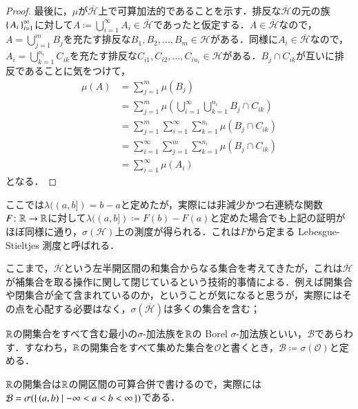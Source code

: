 \begin{proof}
最後に，$\mu$が$\overline{\mathcal{H}}$上で可算加法的であることを示す．排反な$\overline{\mathcal{H}}$の元の族$\set{A_i}_{i=1}^\infty$に対して$A \coloneqq \bigcup_{i=1}^\infty A_i \in \overline{\mathcal{H}}$であったと仮定する．$A \in \overline{\mathcal{H}}$なので，$A = \bigcup_{j=1}^m B_j$を充たす排反な$B_1, B_2, \dots, B_m \in \mathcal{H}$がある．同様に$A_i \in \overline{\mathcal{H}}$なので，$A_i = \bigcup_{k=1}^{n_i} C_{ik}$を充たす排反な$C_{i1},C_{i2},\dots,C_{in_i} \in \mathcal{H}$がある．$B_j \cap C_{ik}$が互いに排反であることに気をつけて，
\begin{align}
\mu(A) &= \sum_{j=1}^m \mu(B_j) \\
&= \sum_{j=1}^m \mu\left(\bigcup_{i=1}^\infty \bigcup_{k=1}^{n_i} B_j \cap C_{ik} \right) \\
&= \sum_{j=1}^m \sum_{i=1}^\infty \sum_{k=1}^{n_i} \mu\left( B_j \cap C_{ik} \right) \\
&= \sum_{i=1}^\infty \sum_{j=1}^m \sum_{k=1}^{n_i} \mu\left( B_j \cap C_{ik} \right) \\
&= \sum_{i=1}^\infty \mu\left( A_i \right)
\end{align}となる．
\end{proof}


\begin{que}[*]
ここでは$\lambda((a,b])=b-a$と定めたが，実際には非減少かつ右連続な関数$F \colon \mathbb{R} \to \mathbb{R}$に対して$\lambda((a,b])\coloneqq F(b)-F(a)$と定めた場合でも上記の証明がほぼ同様に通り，$\sigma(\mathcal{H})$上の測度が得られる．これは$F$から定まる Lebesgue-Stieltjes 測度と呼ばれる．
\end{que}

ここまで，$\overline{\mathcal{H}}$という左半開区間の和集合からなる集合を考えてきたが，これは$\overline{\mathcal{H}}$が補集合を取る操作に関して閉じているという技術的事情による．例えば開集合や閉集合が全て含まれているのか，ということが気になると思うが，実際にはその点を心配する必要はなく，$\sigma\left(\overline{\mathcal{H}}\right)$は多くの集合を含む；

\begin{defi}
$\mathbb{R}$の開集合をすべて含む最小の$\sigma$-加法族を$\mathbb{R}$の Borel $\sigma$-加法族といい，$\mathcal{B}$であらわす．すなわち，$\mathbb{R}$の開集合をすべて集めた集合を$\mathscr{O}$と書くとき，$\mathcal{B} \coloneqq \sigma(\mathscr{O})$と定める．
\end{defi}

\begin{que}
$\mathbb{R}$の開集合は$\mathbb{R}$の開区間の可算合併で書けるので，実際には$\mathcal{B} = \sigma(\set{(a,b) | -\infty < a < b < \infty })$である．
\end{que}

